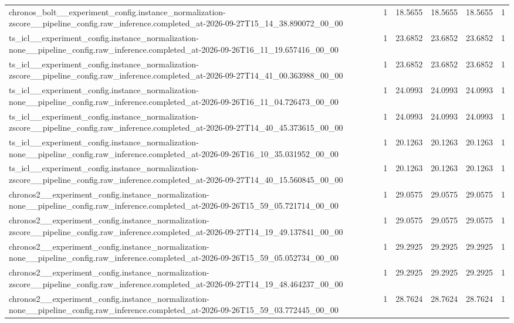 \begin{tabular}{llllll}
chronos\_bolt\_\_experiment\_config.instance\_normalization-zscore\_\_pipeline\_config.raw\_inference.completed\_at-2026-09-27T15\_14\_38.890072\_00\_00 & 1 & 18.5655 & 18.5655 & 18.5655 & 1 \\
ts\_icl\_\_experiment\_config.instance\_normalization-none\_\_pipeline\_config.raw\_inference.completed\_at-2026-09-26T16\_11\_19.657416\_00\_00 & 1 & 23.6852 & 23.6852 & 23.6852 & 1 \\
ts\_icl\_\_experiment\_config.instance\_normalization-zscore\_\_pipeline\_config.raw\_inference.completed\_at-2026-09-27T14\_41\_00.363988\_00\_00 & 1 & 23.6852 & 23.6852 & 23.6852 & 1 \\
ts\_icl\_\_experiment\_config.instance\_normalization-none\_\_pipeline\_config.raw\_inference.completed\_at-2026-09-26T16\_11\_04.726473\_00\_00 & 1 & 24.0993 & 24.0993 & 24.0993 & 1 \\
ts\_icl\_\_experiment\_config.instance\_normalization-zscore\_\_pipeline\_config.raw\_inference.completed\_at-2026-09-27T14\_40\_45.373615\_00\_00 & 1 & 24.0993 & 24.0993 & 24.0993 & 1 \\
ts\_icl\_\_experiment\_config.instance\_normalization-none\_\_pipeline\_config.raw\_inference.completed\_at-2026-09-26T16\_10\_35.031952\_00\_00 & 1 & 20.1263 & 20.1263 & 20.1263 & 1 \\
ts\_icl\_\_experiment\_config.instance\_normalization-zscore\_\_pipeline\_config.raw\_inference.completed\_at-2026-09-27T14\_40\_15.560845\_00\_00 & 1 & 20.1263 & 20.1263 & 20.1263 & 1 \\
chronos2\_\_experiment\_config.instance\_normalization-none\_\_pipeline\_config.raw\_inference.completed\_at-2026-09-26T15\_59\_05.721714\_00\_00 & 1 & 29.0575 & 29.0575 & 29.0575 & 1 \\
chronos2\_\_experiment\_config.instance\_normalization-zscore\_\_pipeline\_config.raw\_inference.completed\_at-2026-09-27T14\_19\_49.137841\_00\_00 & 1 & 29.0575 & 29.0575 & 29.0575 & 1 \\
chronos2\_\_experiment\_config.instance\_normalization-none\_\_pipeline\_config.raw\_inference.completed\_at-2026-09-26T15\_59\_05.052734\_00\_00 & 1 & 29.2925 & 29.2925 & 29.2925 & 1 \\
chronos2\_\_experiment\_config.instance\_normalization-zscore\_\_pipeline\_config.raw\_inference.completed\_at-2026-09-27T14\_19\_48.464237\_00\_00 & 1 & 29.2925 & 29.2925 & 29.2925 & 1 \\
chronos2\_\_experiment\_config.instance\_normalization-none\_\_pipeline\_config.raw\_inference.completed\_at-2026-09-26T15\_59\_03.772445\_00\_00 & 1 & 28.7624 & 28.7624 & 28.7624 & 1 \\

\end{tabular}
